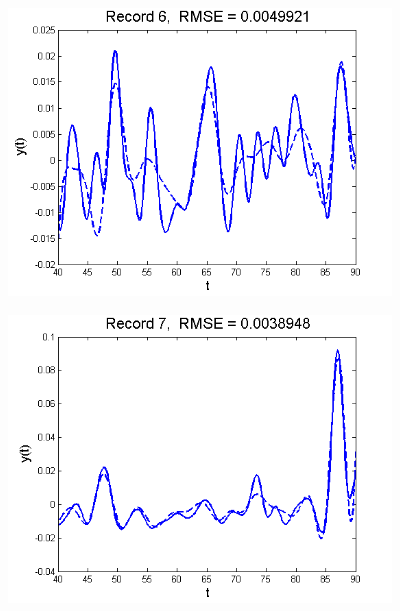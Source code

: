 \documentclass[11pt]{beamer}
\begin{document}
\begin{frame}

\begin{center}
\includegraphics[width=4in]{figs/SelTIC_fit6.png}
\end{center}

\end{frame}


\begin{frame}

\begin{center}
\includegraphics[width=4in]{figs/SelTIC_fit7.png}
\end{center}

\end{frame}

\end{document}
